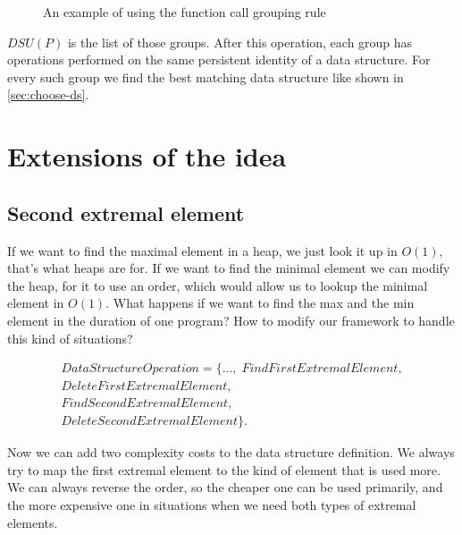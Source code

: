 \documentclass[a4paper,11pt]{article}
\begin{document}
        \begin{figure}[h]
            

            \caption{An example of using the function call grouping rule}

            \label{fig:function-call-grouping}
        \end{figure}

        \clearpage

		$DSU(P)$ is the list of those groups. After this operation, each group has operations performed on the
		same persistent identity of a data structure. For every such group we find the best matching data
		structure like shown in \autoref{sec:choose-ds}.


\pagebreak

\section{Extensions of the idea}

	\subsection{Second extremal element}

		If we want to find the maximal element in a heap, we just look it up in $O(1)$, that's what heaps are
		for.  If we want to find the minimal element we can modify the heap, for it to use an order, which would
		allow us to lookup the minimal element in $O(1)$.  What happens if we want to find the max and the min
		element in the duration of one program?  How to modify our framework to handle this kind of situations?

		\begin{eqnarray*}
			DataStructureOperation = \{\dots, \; FindFirstExtremalElement,\\
			DeleteFirstExtremalElement,\\
			FindSecondExtremalElement,\\
			DeleteSecondExtremalElement\}.
		\end{eqnarray*}

        Now we can add two complexity costs to the data structure definition. We always try to map the first extremal
        element to the kind of element that is used more. We can always reverse the order, so the cheaper one can be
        used primarily, and the more expensive one in situations when we need both types of extremal elements.
\end{document}
